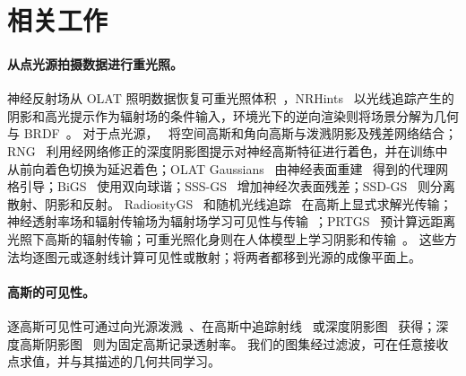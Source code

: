 \section{相关工作}
\label{sec:related}

\paragraph{从点光源拍摄数据进行重光照。}
神经反射场从 OLAT 照明数据恢复可重光照体积~\cite{bi2020neural,bi2020deep}，NRHints~\cite{zeng2023nrhints} 以光线追踪产生的阴影和高光提示作为辐射场的条件输入，环境光下的逆向渲染则将场景分解为几何与 BRDF~\cite{srinivasan2021nerv,zhang2021nerfactor,jin2023tensoir,gao2024relightable,liang2024gsir,jiang2024gaussianshader,chen2025gigs,gu2025irgs}。
对于点光源，\gsthree~\cite{bi2024gs3} 将空间高斯和角向高斯与泼溅阴影及残差网络结合；RNG~\cite{fan2025rng} 利用经网络修正的深度阴影图提示对神经高斯特征进行着色，并在训练中从前向着色切换为延迟着色；OLAT Gaussians~\cite{kuang2024olat} 由神经表面重建~\cite{wang2021neus} 得到的代理网格引导；BiGS~\cite{liu2025bigs} 使用双向球谐；SSS-GS~\cite{dihlmann2024sss} 增加神经次表面残差；SSD-GS~\cite{zheng2026ssdgs} 则分离散射、阴影和反射。
RadiosityGS~\cite{jiang2025radiosity} 和随机光线追踪~\cite{xu2026stochastic} 在高斯上显式求解光传输；神经透射率场和辐射传输场为辐射场学习可见性与传输~\cite{shafiei2021learning,lyu2022neural}；PRTGS~\cite{guo2024prtgs} 预计算远距离光照下高斯的辐射传输；可重光照化身则在人体模型上学习阴影和传输~\cite{bolanos2024gaussian,saito2024rgca,wang2025fullbody}。
这些方法均逐图元或逐射线计算可见性或散射；\ours 将两者都移到光源的成像平面上。

\paragraph{高斯的可见性。}
逐高斯可见性可通过向光源泼溅~\cite{bi2024gs3,zheng2026ssdgs}、在高斯中追踪射线~\cite{gao2024relightable,moenne2024gaussian,gu2025irgs,xu2026stochastic} 或深度阴影图~\cite{fan2025rng} 获得；深度高斯阴影图~\cite{mir2026animated} 则为固定高斯记录透射率。
我们的图集经过滤波，可在任意接收点求值，并与其描述的几何共同学习。

